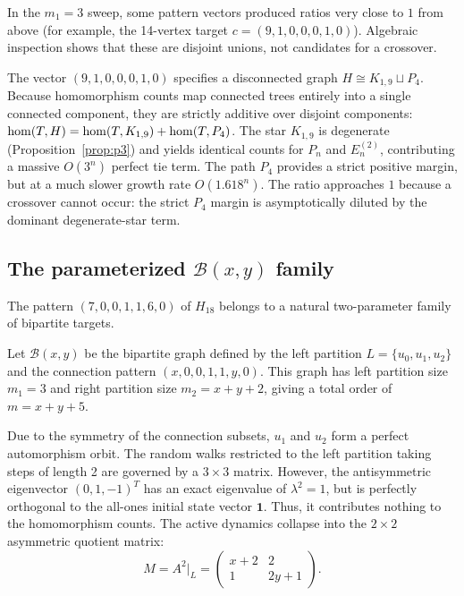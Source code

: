 In the $m_1 = 3$ sweep, some pattern vectors produced ratios very close to
$1$ from above (for example, the 14-vertex target
$c = (9, 1, 0, 0, 0, 1, 0)$). Algebraic inspection shows that these are
disjoint unions, not candidates for a crossover.

The vector $(9, 1, 0, 0, 0, 1, 0)$ specifies a disconnected graph
$H \cong K_{1,9} \sqcup P_4$. Because homomorphism counts map connected trees
entirely into a single connected component, they are strictly additive over
disjoint components: $\mathrm{hom}(T, H) = \mathrm{hom}(T, K_{1,9}) + \mathrm{hom}(T, P_4)$. The star
$K_{1,9}$ is degenerate (Proposition~\ref{prop:p3}) and yields
identical counts for $P_n$ and $E_n^{(2)}$, contributing a massive
$O(3^n)$ perfect tie term. The path $P_4$ provides a strict positive margin,
but at a much slower growth rate $O(1.618^n)$. The ratio approaches $1$
because a crossover cannot occur: the strict $P_4$ margin is asymptotically
diluted by the dominant degenerate-star term.

\subsection{The parameterized \texorpdfstring{$\mathcal{B}(x,y)$}{B(x,y)} family}

The pattern $(7,0,0,1,1,6,0)$ of $H_{18}$ belongs to a natural
two-parameter family of bipartite targets.

Let $\mathcal{B}(x,y)$ be the bipartite graph defined by the left partition
$L = \{u_0, u_1, u_2\}$ and the connection pattern $(x, 0, 0, 1, 1, y, 0)$.
This graph has left partition size $m_1 = 3$ and right partition size
$m_2 = x + y + 2$, giving a total order of $m = x + y + 5$.

Due to the symmetry of the connection subsets, $u_1$ and $u_2$ form a perfect
automorphism orbit. The random walks restricted to the left partition taking
steps of length 2 are governed by a $3 \times 3$ matrix. However, the
antisymmetric eigenvector $(0, 1, -1)^T$ has an exact eigenvalue of $\lambda^2=1$,
but is perfectly orthogonal to the all-ones initial state vector $\mathbf{1}$.
Thus, it contributes nothing to the homomorphism counts. The active dynamics
collapse into the $2 \times 2$ asymmetric quotient matrix:
\begin{equation}
  M = A^2|_L = \begin{pmatrix} x+2 & 2 \\ 1 & 2y+1 \end{pmatrix}.
\end{equation}

